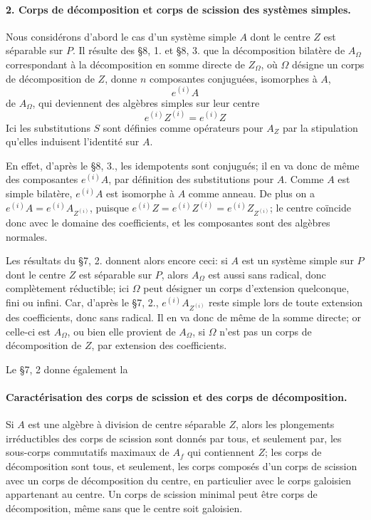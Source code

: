 \paragraph{2. Corps de décomposition et corps de scission des systèmes simples.}
Nous considérons d'abord le cas d'un système simple \(A\) dont le centre \(Z\) est séparable sur \(P\). Il résulte des \S 8, 1. et \S 8, 3. que la décomposition bilatère de \(A_\Omega\) correspondant à la décomposition en somme directe de \(Z_\Omega\), où \(\Omega\) désigne un corps de décomposition de \(Z\), donne \(n\) composantes conjuguées, isomorphes à \(A\),
\[
        e^{(i)}A
\]
de \(A_\Omega\), qui deviennent des algèbres simples sur leur centre
\[
        e^{(i)}Z^{(i)}=e^{(i)}Z
\]
Ici les substitutions \(S\) sont définies comme opérateurs pour \(A_Z\) par la stipulation qu'elles induisent l'identité sur \(A\).

En effet, d'après le \S 8, 3., les idempotents sont conjugués; il en va donc de même des composantes \(e^{(i)}A\), par définition des substitutions pour \(A\). Comme \(A\) est simple bilatère, \(e^{(i)}A\) est isomorphe à \(A\) comme anneau. De plus on a \(e^{(i)}A=e^{(i)}A_{Z^{(i)}}\), puisque \(e^{(i)}Z=e^{(i)}Z^{(i)}=e^{(i)}Z_{Z^{(i)}}\); le centre coïncide donc avec le domaine des coefficients, et les composantes sont des algèbres normales.

Les résultats du \S 7, 2. donnent alors encore ceci: si \(A\) est un système simple sur \(P\) dont le centre \(Z\) est séparable sur \(P\), alors \(A_\Omega\) est aussi sans radical, donc complètement réductible; ici \(\Omega\) peut désigner un corps d'extension quelconque, fini ou infini. Car, d'après le \S 7, 2., \(e^{(i)}A_{Z^{(i)}}\) reste simple lors de toute extension des coefficients, donc sans radical. Il en va donc de même de la somme directe; or celle-ci est \(A_\Omega\), ou bien elle provient de \(A_\Omega\), si \(\Omega\) n'est pas un corps de décomposition de \(Z\), par extension des coefficients.

Le \S 7, 2 donne également la

\paragraph{Caractérisation des corps de scission et des corps de décomposition.}
Si \(A\) est une algèbre à division de centre séparable \(Z\), alors les plongements irréductibles des corps de scission sont donnés par tous, et seulement par, les sous-corps commutatifs maximaux de \(A_f\) qui contiennent \(Z\); les corps de décomposition sont tous, et seulement, les corps composés d'un corps de scission avec un corps de décomposition du centre, en particulier avec le corps galoisien appartenant au centre. Un corps de scission minimal peut être corps de décomposition, même sans que le centre soit galoisien.

